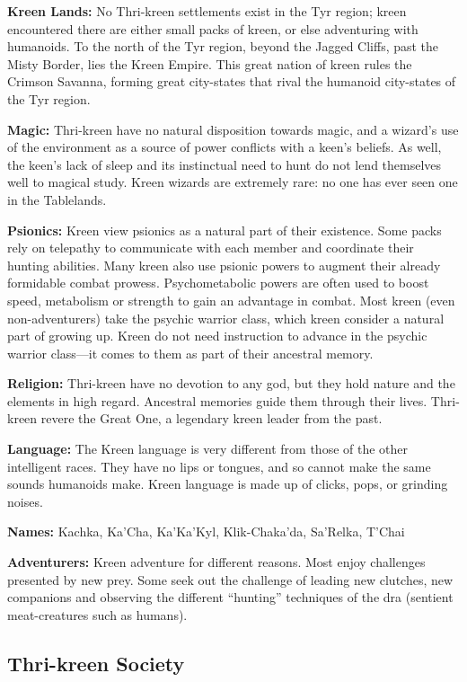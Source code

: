 \textbf{Kreen Lands:} No Thri-kreen settlements exist in the Tyr region; kreen encountered there are either small packs of kreen, or else adventuring with humanoids. To the north of the Tyr region, beyond the Jagged Cliffs, past the Misty Border, lies the Kreen Empire. This great nation of kreen rules the Crimson Savanna, forming great city-states that rival the humanoid city-states of the Tyr region.

\textbf{Magic:} Thri-kreen have no natural disposition towards magic, and a wizard's use of the environment as a source of power conflicts with a keen's beliefs. As well, the keen's lack of sleep and its instinctual need to hunt do not lend themselves well to magical study. Kreen wizards are extremely rare: no one has ever seen one in the Tablelands.

\textbf{Psionics:} Kreen view psionics as a natural part of their existence. Some packs rely on telepathy to communicate with each member and coordinate their hunting abilities. Many kreen also use psionic powers to augment their already formidable combat prowess. Psychometabolic powers are often used to boost speed, metabolism or strength to gain an advantage in combat. Most kreen (even non-adventurers) take the psychic warrior class, which kreen consider a natural part of growing up. Kreen do not need instruction to advance in the psychic warrior class---it comes to them as part of their ancestral memory.

\textbf{Religion:} Thri-kreen have no devotion to any god, but they hold nature and the elements in high regard. Ancestral memories guide them through their lives. Thri-kreen revere the Great One, a legendary kreen leader from the past.

\textbf{Language:} The Kreen language is very different from those of the other intelligent races. They have no lips or tongues, and so cannot make the same sounds humanoids make. Kreen language is made up of clicks, pops, or grinding noises.

\textbf{Names:} Kachka, Ka'Cha, Ka'Ka'Kyl, Klik-Chaka'da, Sa'Relka, T'Chai

\textbf{Adventurers:} Kreen adventure for different reasons. Most enjoy challenges presented by new prey. Some seek out the challenge of leading new clutches, new companions and observing the different ``hunting'' techniques of the dra (sentient meat-creatures such as humans).

\subsection{Thri-kreen Society}

